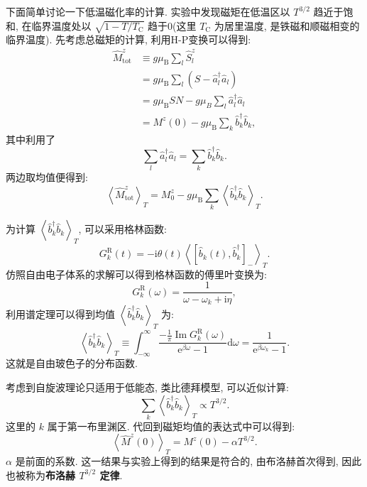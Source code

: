 下面简单讨论一下低温磁化率的计算. 实验中发现磁矩在低温区以 $T^{3 / 2}$ 趋近于饱和, 在临界温度处以 $\sqrt{1-T / T_\mathrm{C}}$ 趋于0(这里 $T_\mathrm{C}$ 为居里温度, 是铁磁和顺磁相变的临界温度). 先考虑总磁矩的计算, 利用H-P变换可以得到:
\begin{align}
\hat{M}^{z}_{\text{tot}} &\equiv g \mu_\mathrm{B} \sum_{l} \hat{S}_{l}^{z} \nonumber\\
&=g \mu_\mathrm{B} \sum_{l}\left(S-\hat{a}_{l}^{\dagger} \hat{a}^{}_{l}\right) \nonumber\\
&=g \mu_\mathrm{B} S N-g \mu_{B} \sum_{l} \hat{a}_{l}^{\dagger} \hat{a}^{}_{l} \nonumber\\
&=M^{z}(0)-g \mu_\mathrm{B} \sum_{k} \hat{b}_{k}^{\dagger} \hat{b}^{}_{k},
\end{align}
其中利用了
\begin{equation}
\sum_{l} \hat{a}_{l}^{\dagger} \hat{a}^{}_{l}=\sum_{k} \hat{b}_{k}^{\dagger} \hat{b}^{}_{k}.
\end{equation}
两边取均值便得到:
\begin{equation}
\left\langle\hat{M}^{z}_{\text{tot}} \right\rangle_{T}=M^{z}_{0}-g \mu_\mathrm{B} \sum_{k}\left\langle\hat{b}_{k}^{\dagger} \hat{b}_{k}^{}\right\rangle_{T}.
\end{equation}

为计算 $\displaystyle\left\langle\hat{b}_{k}^{\dagger} \hat{b}^{}_{k}\right\rangle_{T}$, 可以采用格林函数:
\begin{equation}
G_{k}^\mathrm{R}(t)=-\mathrm{i}\theta(t)\left\langle\left[\hat{b}^{}_{k}(t),\hat{b}_{k}^{\dagger}\right]_{-}\right\rangle_{T}.
\end{equation}
仿照自由电子体系的求解可以得到格林函数的傅里叶变换为:
\begin{equation}
G_{k}^\mathrm{R}(\omega)=\frac{1}{\omega-\omega_{k}+\mathrm{i} \eta},
\end{equation}
利用谱定理可以得到均值 $\left\langle\hat{b}_{k}^{\dagger} \hat{b}_{k}^{}\right\rangle_{T}$ 为:
\begin{equation}
\left\langle\hat{b}_{k}^{\dagger} \hat{b}_{k}^{}\right\rangle_{T} \equiv \int_{-\infty}^{\infty} \frac{-\frac{1}{\pi} \operatorname{Im} G_{k}^\mathrm{R}(\omega)}{\mathrm{e}^{\beta \omega}-1} \mathrm{d} \omega =\frac{1}{\mathrm{e}^{\beta \omega_{k}}-1}.
\end{equation}
这就是自由玻色子的分布函数. 

考虑到自旋波理论只适用于低能态, 类比德拜模型, 可以近似计算:
\begin{equation}\label{HW9}
\sum_{k}\left\langle\hat{b}_{k}^{\dagger} \hat{b}^{}_{k}\right\rangle_{T}\propto T^{3 / 2}.
\end{equation}
这里的 $k$ 属于第一布里渊区. 代回到磁矩均值的表达式中可以得到:
\begin{equation}
\left\langle\hat{M}^{z}(0)\right\rangle_{T}=M^{z}(0)-\alpha T^{3 / 2}.
\end{equation}
$\alpha$ 是前面的系数. 这一结果与实验上得到的结果是符合的, 由布洛赫首次得到, 因此也被称为\textbf{布洛赫 $T^{3 / 2}$ 定律}.

